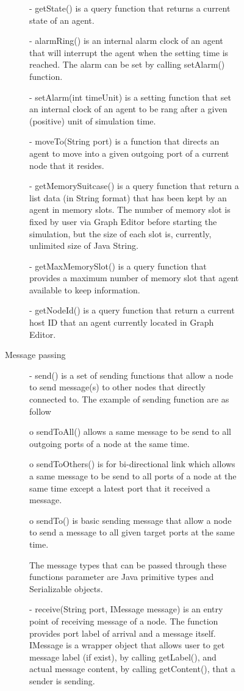 \begin{description}
\begin{description}
\begin{description}
\begin{description}
- getState() is a query function that returns a current state of an agent.

- alarmRing() is an internal alarm clock of an agent that will interrupt the agent when the setting time is reached. The alarm can be set by calling setAlarm() function.

- setAlarm(int timeUnit) is a setting function that set an internal clock of an agent to be rang after a given (positive) unit of simulation time.

- moveTo(String port) is a function that directs an agent to move into a given outgoing port of a current node that it resides.

- getMemorySuitcase() is a query function that return a list data (in String format) that has been kept by an agent in memory slots. The number of memory slot is fixed by user via Graph Editor before starting the simulation, but the size of each slot is, currently, unlimited size of Java String.

- getMaxMemorySlot() is a query function that provides a maximum number of memory slot that agent available to keep information.

- getNodeId() is a query function that return a current host ID that an agent currently located in Graph Editor.


\item[Message passing]

-	send() is a set of sending functions that allow a node to send message(s) to other nodes that directly connected to. The example of sending function are as follow

o	sendToAll() allows a same message to be send to all outgoing ports of a node at the same time.

o	sendToOthers() is for bi-directional link which allows a same message to be send to all ports of a node at the same time except a latest port that it received a message.

o	sendTo() is basic sending message that allow a node to send a message to all given target ports at the same time.

 The message types that can be passed through these functions parameter are Java primitive types and Serializable objects.

- receive(String port, IMessage message) is an entry point of receiving message of a node. The function provides port label of arrival and a message itself. IMessage is a wrapper object that allows user to get message label (if exist), by calling getLabel(), and actual message content, by calling getContent(), that a sender is sending.



\end{description}
\end{description}
\end{description}
\end{description}
